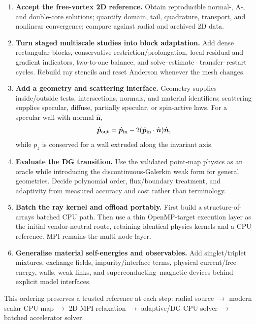 \documentclass[11pt,a4paper]{article}
\newcommand{\phat}{\hat{\bm p}}
\begin{document}
\begin{enumerate}
  \item \textbf{Accept the free-vortex 2D reference.}  Obtain reproducible
  normal-, A-, and double-core solutions; quantify domain, tail, quadrature,
  transport, and nonlinear convergence; compare against radial and archived
  2D data.
  \item \textbf{Turn staged multiscale studies into block adaptation.}  Add
  dense rectangular blocks, conservative restriction/prolongation, local
  residual and gradient indicators, two-to-one balance, and solve--estimate--
  transfer--restart cycles.  Rebuild ray stencils and reset Anderson whenever
  the mesh changes.
  \item \textbf{Add a geometry and scattering interface.}  Geometry supplies
  inside/outside tests, intersections, normals, and material identifiers;
  scattering supplies specular, diffuse, partially specular, or spin-active
  laws.  For a specular wall with normal $\hat{\bm n}$,
  \begin{equation}
    \phat_{\rm out}=\phat_{\rm in}
      -2(\phat_{\rm in}\cdot\hat{\bm n})\hat{\bm n},
  \end{equation}
  while $p_z$ is conserved for a wall extruded along the invariant axis.
  \item \textbf{Evaluate the DG transition.}  Use the validated point-map
  physics as an oracle while introducing the discontinuous-Galerkin weak form
  for general geometries.  Decide polynomial order, flux/boundary treatment,
  and adaptivity from measured accuracy and cost rather than terminology.
  \item \textbf{Batch the ray kernel and offload portably.}  First build a
  structure-of-arrays batched CPU path.  Then use a thin OpenMP-target
  execution layer as the initial vendor-neutral route, retaining identical
  physics kernels and a CPU reference.  MPI remains the multi-node layer.
  \item \textbf{Generalise material self-energies and observables.}  Add
  singlet/triplet mixtures, exchange fields, impurity/interface terms, physical
  current/free energy, walls, weak links, and superconducting--magnetic
  devices behind explicit model interfaces.
\end{enumerate}

This ordering preserves a trusted reference at each step: radial source
$\rightarrow$ modern scalar CPU map $\rightarrow$ 2D MPI relaxation
$\rightarrow$ adaptive/DG CPU solver $\rightarrow$ batched accelerator solver.
\end{document}

